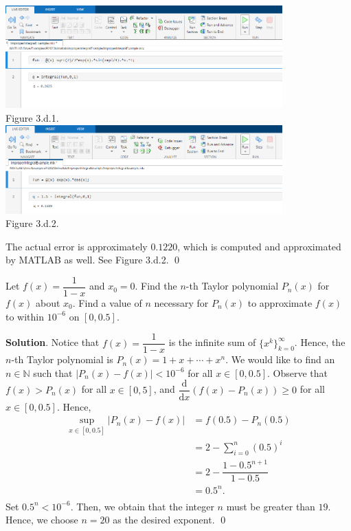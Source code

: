 \documentclass[11pt]{article}
\theoremstyle{break}
\newcommand{\dd}{\text{d}}
\numberwithin{equation}{theorem}
\begin{document}
\begin{enumerate}
\begin{center}
        \includegraphics[width=0.8\textwidth]{P3d1.png}\\
        Figure 3.d.1.\\\vspace{1.9em}
        \includegraphics[width=0.8\textwidth]{P3d2.png}\\
        Figure 3.d.2.
    \end{center}
    The actual error is approximately $0.1220$, which is computed and approximated by MATLAB as well. See Figure 3.d.2. \qed
\end{enumerate}

\newpage
\begin{problem}\label{problem 4}
    Let $f(x)=\dfrac{1}{1-x}$ and $x_0=0$. Find the $n$-th Taylor polynomial $P_n(x)$ for $f(x)$ about $x_0$. Find a value of $n$ necessary for $P_n(x)$ to approximate $f(x)$ to within $10^{-6}$ on $[0, 0.5]$.
\end{problem}
\textbf{Solution}. Notice that $f(x)=\dfrac{1}{1-x}$ is the infinite sum of $\{x^k\}_{k=0}^\infty$. Hence, the $n$-th Taylor polynomial is $\displaystyle P_n(x)=1+x+\cdots+x^n$. We would like to find an $n\in\mathbb{N}$ such that $|P_n(x)-f(x)|<10^{-6}$ for all $x\in[0, 0.5]$. Observe that $f(x)>P_n(x)$ for all $x\in[0, 5]$, and $\dfrac{\dd}{\dd x}\left(f(x)-P_n(x)\right)\geq 0$ for all $x\in[0, 0.5]$. Hence, \vspace{-0.6em}
\begin{align*}
    \sup_{x\in[0, 0.5]}|P_n(x)-f(x)|&=f(0.5)-P_n(0.5)\\
    &=2-\sum_{i=0}^{n}(0.5)^i\\
    &=2-\dfrac{1-0.5^{n+1}}{1-0.5}\\
    &=0.5^n.\\[-3.4em]
\end{align*}
Set $0.5^n<10^{-6}$. Then, we obtain that the integer $n$ must be greater than $19$. Hence, we choose $n=20$ as the desired exponent. \qed
\end{document}
